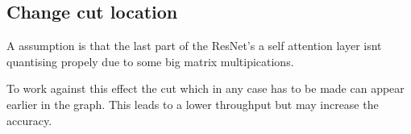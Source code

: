 \subsection{Change cut location}
A assumption is that the last part of the ResNet's a self attention layer isnt quantising propely due to some big matrix multipications.

To work against this effect the cut which in any case has to be made can appear earlier in the graph.
This leads to a lower throughput but may increase the accuracy.